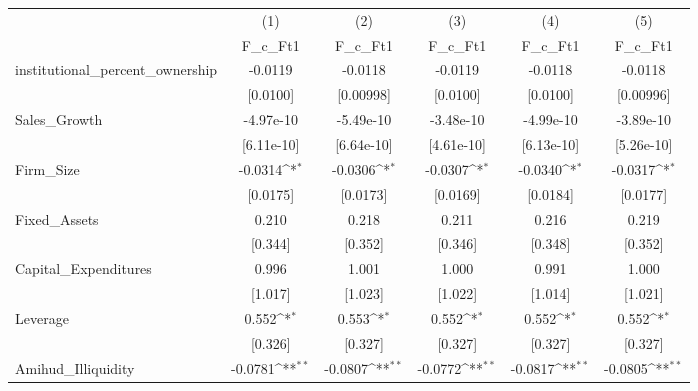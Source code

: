 {
\def\sym#1{\ifmmode^{#1}\else\(^{#1}\)\fi}
\begin{tabular}{l*{5}{c}}
\hline\hline
            &\multicolumn{1}{c}{(1)}&\multicolumn{1}{c}{(2)}&\multicolumn{1}{c}{(3)}&\multicolumn{1}{c}{(4)}&\multicolumn{1}{c}{(5)}\\
            &\multicolumn{1}{c}{F\_c\_Ft1}&\multicolumn{1}{c}{F\_c\_Ft1}&\multicolumn{1}{c}{F\_c\_Ft1}&\multicolumn{1}{c}{F\_c\_Ft1}&\multicolumn{1}{c}{F\_c\_Ft1}\\
\hline
institutional\_percent\_ownership&     -0.0119         &     -0.0118         &     -0.0119         &     -0.0118         &     -0.0118         \\
            &    [0.0100]         &   [0.00998]         &    [0.0100]         &    [0.0100]         &   [0.00996]         \\
[1em]
Sales\_Growth&   -4.97e-10         &   -5.49e-10         &   -3.48e-10         &   -4.99e-10         &   -3.89e-10         \\
            &  [6.11e-10]         &  [6.64e-10]         &  [4.61e-10]         &  [6.13e-10]         &  [5.26e-10]         \\
[1em]
Firm\_Size   &     -0.0314\sym{*}  &     -0.0306\sym{*}  &     -0.0307\sym{*}  &     -0.0340\sym{*}  &     -0.0317\sym{*}  \\
            &    [0.0175]         &    [0.0173]         &    [0.0169]         &    [0.0184]         &    [0.0177]         \\
[1em]
Fixed\_Assets&       0.210         &       0.218         &       0.211         &       0.216         &       0.219         \\
            &     [0.344]         &     [0.352]         &     [0.346]         &     [0.348]         &     [0.352]         \\
[1em]
Capital\_Expenditures&       0.996         &       1.001         &       1.000         &       0.991         &       1.000         \\
            &     [1.017]         &     [1.023]         &     [1.022]         &     [1.014]         &     [1.021]         \\
[1em]
Leverage    &       0.552\sym{*}  &       0.553\sym{*}  &       0.552\sym{*}  &       0.552\sym{*}  &       0.552\sym{*}  \\
            &     [0.326]         &     [0.327]         &     [0.327]         &     [0.327]         &     [0.327]         \\
[1em]
Amihud\_Illiquidity&     -0.0781\sym{**} &     -0.0807\sym{**} &     -0.0772\sym{**} &     -0.0817\sym{**} &     -0.0805\sym{**} \\

\end{tabular}}
